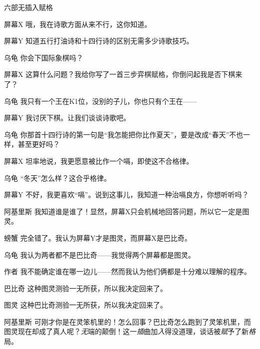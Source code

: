 \begin{dialog}{六部无插入赋格}
\begin{dialogue}
\item[屏幕X]哦，我在诗歌方面从来不行，这你知道。

\item[屏幕Y]知道五行打油诗和十四行诗的区别无需多少诗歌技巧。

\item[乌龟]你会下国际象棋吗？

\item[屏幕X]这算什么问题？我给你写了一首三步弈棋赋格，你倒问起我是否下棋来了？

\item[乌龟]我只有一个王在K1位，没别的子儿，你也只有个王在——

\item[屏幕Y]我讨厌下棋。让我们谈谈诗歌吧。

\item[乌龟]你那首十四行诗的第一句是“我怎能把你比作夏天”，要是改成“春天”不也一样，甚至更好吗？

\item[屏幕X]坦率地说，我更愿意被比作一个嗝，即使这不合格律。

\item[乌龟]“冬天”怎么样？这合乎格律。

\item[屏幕Y]不好，我更喜欢“嗝”。说到这事儿，我知道一种治嗝良方，你想听听吗？

\item[阿基里斯]我知道谁是谁了！显然，屏幕X只会机械地回答问题，所以它一定是图灵。

\item[螃蟹]完全错了。我认为屏幕Y才是图灵，而屏幕X是巴比奇。

\item[乌龟]我认为两者都不是巴比奇——我觉得两个屏幕都是图灵。

\item[作者]我不能确定谁在哪一边儿——然而我认为他们俩都是十分难以理解的程序。


\item[巴比奇]这种图灵测验一无所获，所以我决定回来了。

\item[图灵]这种巴比奇测验一无所获，所以我决定回来了。

\item[阿基里斯]可刚才你是在灵笨机里的！怎么回事？巴比奇怎么跑到了灵笨机里，而图灵现在却成了真人呢？\emph{无}端的颠倒！这一\emph{插}曲加\emph{入}得没道理，谈话被\emph{赋}予了新\emph{格}局。


\end{dialogue}
\end{dialog}
